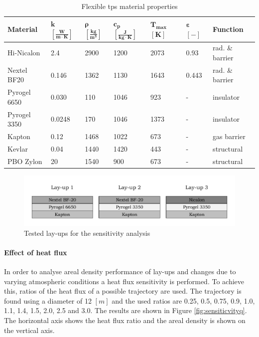 \begin{table}[ht]
	\caption {Flexible \acrlong{tps} material properties \cite{Corso2009,Corso2011,DuPont2011,Smith2011,Nye,Zinkle1998}}
	\centering
	\begin{tabular}{|l|l|l|l|l|l|l|}
		\hline
		\textbf{Material}         & \textbf{ $\mathbf{k}$ $\mathbf{\left[\frac{W}{m\cdot K}\right]} $} & \textbf{ $\mathbf{ \rho }$ $\mathbf{ \left[ \frac{kg}{m^3} \right] }$} & \textbf{  $\mathbf{ c_{p} }$ $\mathbf{ \left[ \frac{J}{kg \cdot K} \right] }$ }& \textbf{ $\mathbf{ T_{max} }$ $\mathbf{ [ K ] }$} &\textbf{ $\mathbf{ \varepsilon }$ $\mathbf{ [ - ] }$} & \textbf{Function} \\[1.6ex]   \hline \hline
		Hi-Nicalon			& 2.4			& 2900	& 1200	& 2073	& 0.93	& rad. \& barrier	\\ \hline
		Nextel BF20			& 0.146			& 1362	& 1130	& 1643	& 0.443	& rad. \& barrier	\\ \hline
		Pyrogel 6650		& 0.030			& 110	& 1046	& 923	& -		& insulator			\\ \hline
		Pyrogel 3350		& 0.0248		& 170	& 1046	& 1373	& -		& insulator			\\ \hline
		Kapton				& 0.12			& 1468	& 1022	& 673	& -		& gas barrier		\\ \hline
		Kevlar				& 0.04			& 1440	& 1420	& 443	& -		& structural		\\ \hline
		PBO Zylon			& 20			& 1540	& 900	& 673	& -		& structural		\\ \hline

	\end{tabular}
	\label{tab:tpsmatprop}
\end{table}

\begin{figure}[h]
	\centering
	\includegraphics{./Figure/Thermal/layersensthermal.pdf}
	\caption{Tested lay-ups for the sensitivity analysis}
	\label{fig:layersensthermal}
\end{figure}

\paragraph{Effect of heat flux}
In order to analyse areal density performance of lay-ups and changes due to varying atmospheric conditions a heat flux sensitivity is performed. To achieve this, ratios of the heat flux of a possible trajectory are used. The trajectory is found using a diameter of 12 $ \left[ m \right]$ and the used ratios are 0.25, 0.5, 0.75, 0.9, 1.0, 1.1, 1.4, 1.5, 2.0, 2.5 and 3.0. The results are shown in Figure \ref{fig:sensiticvityq}. The horizontal axis shows the heat flux ratio and the areal density is shown on the vertical axis. 

